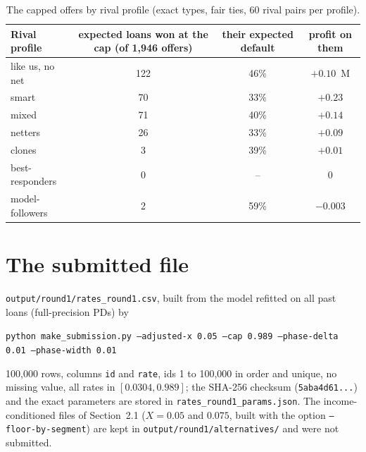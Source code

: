 \documentclass[11pt,a4paper]{article}
\newcommand{\meur}{M\texteuro}
\newcommand{\code}[1]{\texttt{#1}}
\begin{document}
\begin{table}[h]\centering\small
\begin{tabular}{lccc}
\toprule
Rival profile & expected loans won at the cap (of 1,946 offers) & their expected default & profit on them\\
\midrule
like us, no net & 122 & 46\% & $+0.10$~\meur{}\\
smart & 70 & 33\% & $+0.23$\\
mixed & 71 & 40\% & $+0.14$\\
netters & 26 & 33\% & $+0.09$\\
clones & 3 & 39\% & $+0.01$\\
best-responders & 0 & -- & 0\\
model-followers & 2 & 59\% & $-0.003$\\
\bottomrule
\end{tabular}
\caption{The capped offers by rival profile (exact types, fair ties, 60 rival pairs per profile).}
\label{tab:cap}
\end{table}

\section{The submitted file}
\code{output/round1/rates\_round1.csv}, built from the model refitted on all past loans (full-precision PDs) by
\begin{center}\code{python make\_submission.py --adjusted-x 0.05 --cap 0.989 --phase-delta 0.01 --phase-width 0.01}\end{center}
100,000 rows, columns \code{id} and \code{rate}, ids 1 to 100,000 in order and unique, no missing value, all rates in
$[0.0304, 0.989]$; the SHA-256 checksum (\code{5aba4d61...}) and the exact parameters are stored in
\code{rates\_round1\_params.json}. The income-conditioned files of Section~2.1 ($X = 0.05$ and $0.075$, built with the
option \code{--floor-by-segment}) are kept in \code{output/round1/alternatives/} and were not submitted.

\begin{table}[h]\centering\small
{}
\caption{Composition of the file: 54,418 applicants below their segment's threshold (rates 3.0\% to 18.6\%) and 45,582
above it, priced on the adjusted break-even (12.8\% to 98.9\%), of which 2,027 at the cap.}
\end{table}
\end{document}
